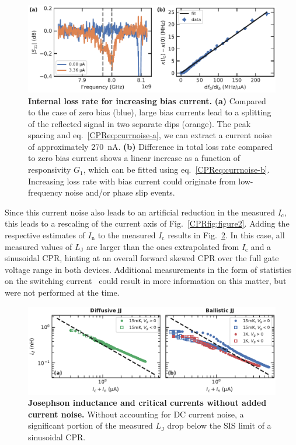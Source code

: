 \begin{figure}
	\centering
	\includegraphics[width=\linewidth]{chapter-gJJ-CPR/figs/SMFigure-lossrates-current}
	\caption{
		\textbf{Internal loss rate for increasing bias current.}
		\textbf{(a)} Compared to the case of zero bias (blue), large bias currents lead to a splitting of the reflected signal in two separate dips (orange).
		The peak spacing and eq.~\ref{CPReq:currnoise-a}, we can extract a current noise of approximately \SI{270}{\nano\ampere}.
		\textbf{(b)} Difference in total loss rate compared to zero bias current shows a linear increase as a function of responsivity $G_1$, which can be fitted using eq.~\ref{CPReq:currnoise-b}.
		Increasing loss rate with bias current could originate from  low-frequency noise and/or phase slip events.
	}
	\label{CPRfig:SMFig-lossrates-current}
\end{figure}

Since this current noise also leads to an artificial reduction in the measured $I_\text{c}$, this leads to a rescaling of the current axis of Fig.~\ref{CPRfig:figure2}.
%
Adding the respective estimates of $I_\text{n}$ to the measured $I_\text{c}$ results in Fig.~\ref{CPRfig:SMfigure2}.
%
In this case, all measured values of $L_\text{J}$ are larger than the ones extrapolated from $I_\text{c}$ and a sinusoidal CPR, hinting at an overall forward skewed CPR over the full gate voltage range in both devices.
%
Additional measurements in the form of statistics on the switching current~\cite{kiviojaWeakCouplingJosephson2005a,coskunDistributionSupercurrentSwitching2012,leeProximityCouplingSuperconductorgraphene2018a} could result in more information on this matter, but were not performed at the time.

\begin{figure}
	\centering
	\includegraphics[width=\linewidth]{chapter-gJJ-CPR/figs/Figure2}
	\caption{
		\textbf{Josephson inductance and critical currents without added current noise.}
		Without accounting for DC current noise, a significant portion of the measured $L_\text{J}$ drop below the SIS limit of a sinusoidal CPR.
	}
	\label{CPRfig:SMfigure2}
\end{figure}





